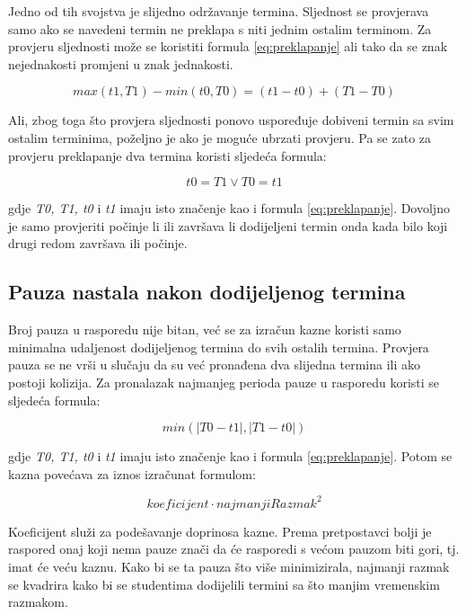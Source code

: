\documentclass[times, utf8, zavrsni]{fer}
\begin{document}
Jedno od tih svojstva je slijedno održavanje termina. Sljednost se provjerava samo ako se navedeni termin ne preklapa s niti jednim ostalim terminom. Za provjeru sljednosti može se koristiti formula \ref{eq:preklapanje} ali tako da se znak nejednakosti promjeni u znak jednakosti.

\begin{equation}
max(t1, T1) - min(t0, T0) = (t1 - t0) + (T1  - T0)
\label{eq:slijednost-long}
\end{equation}

Ali, zbog toga što provjera sljednosti ponovo uspoređuje dobiveni termin sa svim ostalim terminima, poželjno je ako je moguće ubrzati provjeru. Pa se zato za provjeru preklapanje dva termina koristi sljedeća formula:

\begin{equation}
t0 = T1 \lor T0 = t1
\label{eq:slijednost-short}
\end{equation}

gdje \emph{T0, T1, t0} i \emph{t1} imaju isto značenje kao i formula \ref{eq:preklapanje}. Dovoljno je samo provjeriti počinje li ili završava li dodijeljeni termin onda kada bilo koji drugi redom završava ili počinje.

\subsection{Pauza nastala nakon dodijeljenog termina}

Broj pauza u rasporedu nije bitan, već se za izračun kazne koristi samo minimalna udaljenost dodijeljenog termina do svih ostalih termina. Provjera pauza se ne vrši u slučaju da su već pronađena dva slijedna termina ili ako postoji kolizija. Za pronalazak najmanjeg perioda pauze u rasporedu koristi se sljedeća formula:

\begin{equation}
min(|T0 - t1|, |T1 - t0|)
\label{eq:min-rupa}
\end{equation}

gdje \emph{T0, T1, t0} i \emph{t1} imaju isto značenje kao i formula \ref{eq:preklapanje}. Potom se kazna povećava za iznos izračunat formulom:

\begin{equation}
koeficijent \cdot najmanjiRazmak^2
\label{eq:min-rupa-kazna}
\end{equation}

Koeficijent služi za podešavanje doprinosa kazne. Prema pretpostavci bolji je raspored onaj koji nema pauze znači da će rasporedi s većom pauzom biti gori, tj. imat će veću kaznu. Kako bi se ta pauza što više minimizirala, najmanji razmak se kvadrira kako bi se studentima dodijelili termini sa što manjim vremenskim razmakom.
\end{document}
